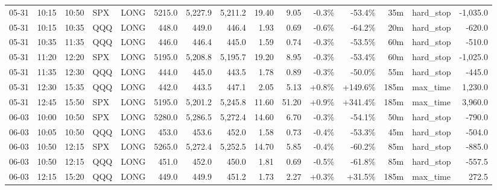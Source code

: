 \documentclass[11pt,a4paper,twoside]{article}
\begin{document}
\begin{landscape}
\begin{center}
\begin{longtable}{>{\color{txtmain}}l l l l l r r r r r r r r >{\color{txtmain}}l r}
05-31 & 10:15 & 10:50 & SPX & LONG & 5215.0 & 5,227.9 & 5,211.2 & 19.40 & 9.05 & \textcolor{lossred}{-0.3\%} & \textcolor{lossred}{-53.4\%} & 35m & hard\_stop & \textcolor{lossred}{-1,035.0} \\
05-31 & 10:15 & 10:35 & QQQ & LONG & 448.0 & 449.0 & 446.4 & 1.93 & 0.69 & \textcolor{lossred}{-0.6\%} & \textcolor{lossred}{-64.2\%} & 20m & hard\_stop & \textcolor{lossred}{-620.0} \\
05-31 & 10:35 & 11:35 & QQQ & LONG & 446.0 & 446.4 & 445.0 & 1.59 & 0.74 & \textcolor{lossred}{-0.3\%} & \textcolor{lossred}{-53.5\%} & 60m & hard\_stop & \textcolor{lossred}{-510.0} \\
05-31 & 11:20 & 12:20 & SPX & LONG & 5195.0 & 5,208.8 & 5,195.7 & 19.20 & 8.95 & \textcolor{lossred}{-0.3\%} & \textcolor{lossred}{-53.4\%} & 60m & hard\_stop & \textcolor{lossred}{-1,025.0} \\
05-31 & 11:35 & 12:30 & QQQ & LONG & 444.0 & 445.0 & 443.5 & 1.78 & 0.89 & \textcolor{lossred}{-0.3\%} & \textcolor{lossred}{-50.0\%} & 55m & hard\_stop & \textcolor{lossred}{-445.0} \\
05-31 & 12:30 & 15:35 & QQQ & LONG & 442.0 & 443.5 & 447.1 & 2.05 & 5.13 & \textcolor{wingreen}{+0.8\%} & \textcolor{wingreen}{+149.6\%} & 185m & max\_time & \textcolor{wingreen}{1,230.0} \\
05-31 & 12:45 & 15:50 & SPX & LONG & 5195.0 & 5,201.2 & 5,245.8 & 11.60 & 51.20 & \textcolor{wingreen}{+0.9\%} & \textcolor{wingreen}{+341.4\%} & 185m & max\_time & \textcolor{wingreen}{3,960.0} \\
06-03 & 10:00 & 10:50 & SPX & LONG & 5280.0 & 5,286.5 & 5,272.4 & 14.60 & 6.70 & \textcolor{lossred}{-0.3\%} & \textcolor{lossred}{-54.1\%} & 50m & hard\_stop & \textcolor{lossred}{-790.0} \\
06-03 & 10:05 & 10:50 & QQQ & LONG & 453.0 & 453.6 & 452.0 & 1.58 & 0.73 & \textcolor{lossred}{-0.4\%} & \textcolor{lossred}{-53.3\%} & 45m & hard\_stop & \textcolor{lossred}{-504.0} \\
06-03 & 10:50 & 12:15 & SPX & LONG & 5265.0 & 5,272.4 & 5,252.5 & 14.70 & 5.85 & \textcolor{lossred}{-0.4\%} & \textcolor{lossred}{-60.2\%} & 85m & hard\_stop & \textcolor{lossred}{-885.0} \\
06-03 & 10:50 & 12:15 & QQQ & LONG & 451.0 & 452.0 & 450.0 & 1.81 & 0.69 & \textcolor{lossred}{-0.5\%} & \textcolor{lossred}{-61.8\%} & 85m & hard\_stop & \textcolor{lossred}{-557.5} \\
06-03 & 12:15 & 15:20 & QQQ & LONG & 449.0 & 449.9 & 451.2 & 1.73 & 2.27 & \textcolor{wingreen}{+0.3\%} & \textcolor{wingreen}{+31.5\%} & 185m & max\_time & \textcolor{wingreen}{272.5} \\

\end{longtable}
\end{center}
\end{landscape}
\end{document}
